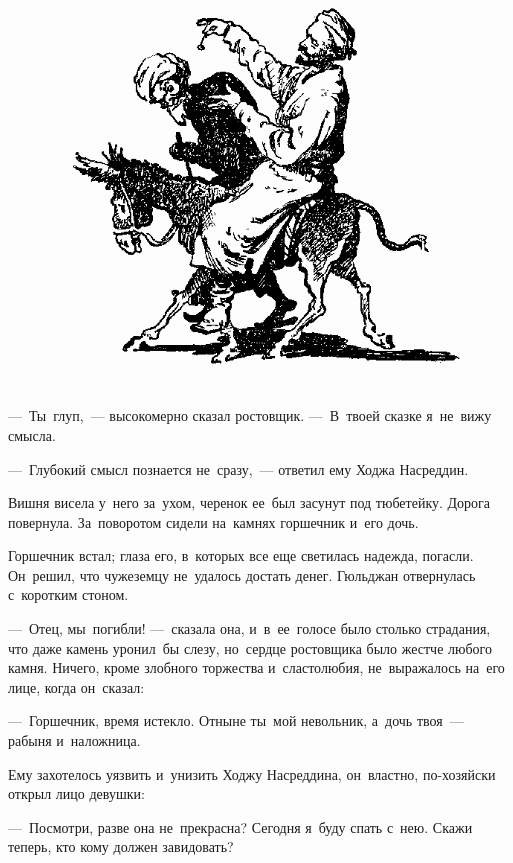 \documentclass[12pt,a4paper]{book}
\begin{document}
\begin{figure}[h]
\centering
\includegraphics[width=\textwidth]{9.png}
\end{figure}

—~Ты~глуп,~— высокомерно сказал ростовщик. —~В~твоей сказке я~не~вижу смысла.

—~Глубокий смысл познается не~сразу,~— ответил ему Ходжа Насреддин.

Вишня висела у~него за~ухом, черенок ее~был засунут под тюбетейку. Дорога повернула. За~поворотом сидели на~камнях горшечник и~его дочь.

Горшечник встал; глаза его, в~которых все еще светилась надежда, погасли. Он~решил, что чужеземцу не~удалось достать денег. Гюльджан отвернулась с~коротким стоном.

—~Отец, мы~погибли! —~сказала она, и~в~ее~голосе было столько страдания, что даже камень уронил~бы слезу, но~сердце ростовщика было жестче любого камня. Ничего, кроме злобного торжества и~сластолюбия, не~выражалось на~его лице, когда он~сказал:

—~Горшечник, время истекло. Отныне ты~мой невольник, а~дочь твоя~— рабыня и~наложница.

Ему захотелось уязвить и~унизить Ходжу Насреддина, он~властно, по-хозяйски открыл лицо девушки:

—~Посмотри, разве она не~прекрасна? Сегодня я~буду спать с~нею. Скажи теперь, кто кому должен завидовать?
\end{document}
